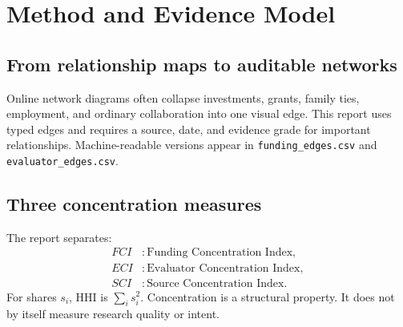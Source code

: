 \documentclass[11pt,twoside]{article}
\begin{document}
\section{Method and Evidence Model}
\subsection{From relationship maps to auditable networks}
Online network diagrams often collapse investments, grants, family ties, employment, and ordinary collaboration into one visual edge. This report uses typed edges and requires a source, date, and evidence grade for important relationships. Machine-readable versions appear in \texttt{funding\_edges.csv} and \texttt{evaluator\_edges.csv}.

\begin{center}
\end{center}

\subsection{Three concentration measures}
The report separates:
\begin{align*}
FCI &: \text{Funding Concentration Index},\\
ECI &: \text{Evaluator Concentration Index},\\
SCI &: \text{Source Concentration Index}.
\end{align*}
For shares $s_i$, HHI is $\sum_i s_i^2$. Concentration is a structural property. It does not by itself measure research quality or intent.
\end{document}
